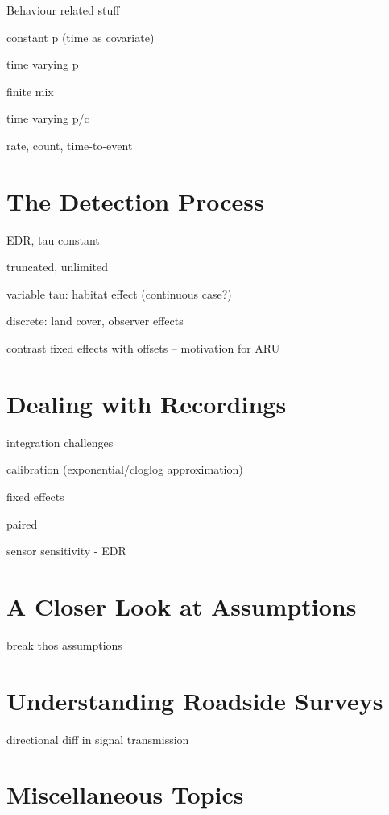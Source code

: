\documentclass[12pt,]{book}
\begin{document}
Behaviour related stuff

constant p (time as covariate)

time varying p

finite mix

time varying p/c

rate, count, time-to-event

\hypertarget{detection}{%
\chapter{The Detection Process}\label{detection}}

EDR, tau constant

truncated, unlimited

variable tau: habitat effect (continuous case?)

discrete: land cover, observer effects

contrast fixed effects with offsets -- motivation for ARU

\hypertarget{recordings}{%
\chapter{Dealing with Recordings}\label{recordings}}

integration challenges

calibration (exponential/cloglog approximation)

fixed effects

paired

sensor sensitivity - EDR

\hypertarget{assumptions}{%
\chapter{A Closer Look at Assumptions}\label{assumptions}}

break thos assumptions

\hypertarget{roadsides}{%
\chapter{Understanding Roadside Surveys}\label{roadsides}}

directional diff in signal transmission

\hypertarget{extras}{%
\chapter{Miscellaneous Topics}\label{extras}}
\end{document}
